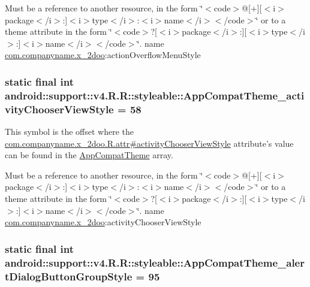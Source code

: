 Must be a reference to another resource, in the form \char`\"{}$<$code$>$@\mbox{[}+\mbox{]}\mbox{[}$<$i$>$package$<$/i$>$:\mbox{]}$<$i$>$type$<$/i$>$:$<$i$>$name$<$/i$>$$<$/code$>$\char`\"{} or to a theme attribute in the form \char`\"{}$<$code$>$?\mbox{[}$<$i$>$package$<$/i$>$:\mbox{]}\mbox{[}$<$i$>$type$<$/i$>$:\mbox{]}$<$i$>$name$<$/i$>$$<$/code$>$\char`\"{}.  name \hyperlink{namespacecom_1_1companyname_1_1x__2doo}{com.companyname.x\_\-2doo}:actionOverflowMenuStyle \hypertarget{classandroid_1_1support_1_1v4_1_1_r_1_1styleable_69fd4d038df58587b69f6986d49ed8c1}{
\subsubsection[{AppCompatTheme\_\-activityChooserViewStyle}]{\setlength{\rightskip}{0pt plus 5cm}static final int android::support::v4.R.R::styleable::AppCompatTheme\_\-activityChooserViewStyle = 58}}
\label{classandroid_1_1support_1_1v4_1_1_r_1_1styleable_69fd4d038df58587b69f6986d49ed8c1}


This symbol is the offset where the \hyperlink{classcom_1_1companyname_1_1x__2doo_1_1_r_1_1attr_4444d756ef9b2e891b50aa60451cc482}{com.companyname.x\_\-2doo.R.attr\#activityChooserViewStyle} attribute's value can be found in the \hyperlink{classandroid_1_1support_1_1v4_1_1_r_1_1styleable_0873e92ba21076bb5a4aeadeb7f5779f}{AppCompatTheme} array.

Must be a reference to another resource, in the form \char`\"{}$<$code$>$@\mbox{[}+\mbox{]}\mbox{[}$<$i$>$package$<$/i$>$:\mbox{]}$<$i$>$type$<$/i$>$:$<$i$>$name$<$/i$>$$<$/code$>$\char`\"{} or to a theme attribute in the form \char`\"{}$<$code$>$?\mbox{[}$<$i$>$package$<$/i$>$:\mbox{]}\mbox{[}$<$i$>$type$<$/i$>$:\mbox{]}$<$i$>$name$<$/i$>$$<$/code$>$\char`\"{}.  name \hyperlink{namespacecom_1_1companyname_1_1x__2doo}{com.companyname.x\_\-2doo}:activityChooserViewStyle \hypertarget{classandroid_1_1support_1_1v4_1_1_r_1_1styleable_00941c54362f2db3092824ceb3be22dd}{
\subsubsection[{AppCompatTheme\_\-alertDialogButtonGroupStyle}]{\setlength{\rightskip}{0pt plus 5cm}static final int android::support::v4.R.R::styleable::AppCompatTheme\_\-alertDialogButtonGroupStyle = 95}}
\label{classandroid_1_1support_1_1v4_1_1_r_1_1styleable_00941c54362f2db3092824ceb3be22dd}


